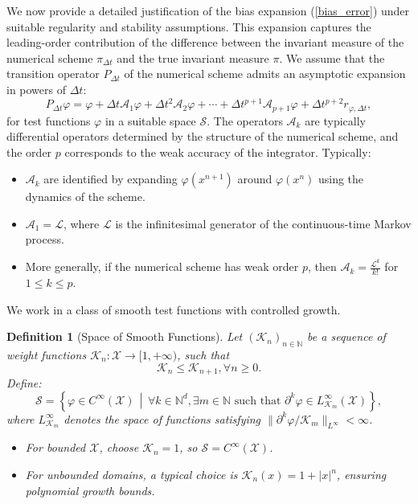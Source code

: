 \documentclass{article}
\newtheorem{definition}[theorem]{Definition}
\begin{document}
We now provide a detailed justification of the bias expansion (\ref{bias_error}) under suitable regularity and stability assumptions. This expansion captures the leading-order contribution of the difference between the invariant measure of the numerical scheme $\pi_{\Delta t}$ and the true invariant measure $\pi$. We assume that the transition operator $P_{\Delta t}$ of the numerical scheme admits an asymptotic expansion in powers of $\Delta t$:
\[
P_{\Delta t} \varphi = \varphi + \Delta t \mathcal{A}_1 \varphi + \Delta t^2 \mathcal{A}_2 \varphi + \cdots + \Delta t^{p+1} \mathcal{A}_{p+1} \varphi + \Delta t^{p+2} r_{\varphi, \Delta t},
\]
for test functions $\varphi$ in a suitable space $\mathcal{S}$. The operators $\mathcal{A}_k$ are typically differential operators determined by the structure of the numerical scheme, and the order $p$ corresponds to the weak accuracy of the integrator. Typically:
\begin{itemize}
    \item $\mathcal{A}_k$ are identified by expanding $\varphi(x^{n+1})$ around $\varphi(x^n)$ using the dynamics of the scheme.
    \item $\mathcal{A}_1 = \mathcal{L}$, where $\mathcal{L}$ is the infinitesimal generator of the continuous-time Markov process.
    \item More generally, if the numerical scheme has weak order $p$, then $\mathcal{A}_k = \frac{\mathcal{L}^k}{k!}$ for $1 \leq k \leq p$.
\end{itemize}  
We work in a class of smooth test functions with controlled growth.
\begin{definition}[Space of Smooth Functions]
Let $(\mathcal{K}_n)_{n \in \mathbb{N}}$ be a sequence of weight functions $\mathcal{K}_n : \mathcal{X} \to [1, +\infty)$, such that
\[\mathcal{K}_n \leq \mathcal{K}_{n+1}, \forall n \geq 0.\]
Define:
\[
\mathcal{S} = \left\{ \varphi \in C^\infty(\mathcal{X}) \,\middle|\, \forall k \in \mathbb{N}^d, \exists m \in \mathbb{N} \text{ such that } \partial^k \varphi \in L^\infty_{\mathcal{K}_m}(\mathcal{X}) \right\},
\]
where $L^\infty_{\mathcal{K}_m}$ denotes the space of functions satisfying $\|\partial^k \varphi / \mathcal{K}_m\|_{L^\infty} < \infty$.

\begin{itemize}
    \item For bounded $\mathcal{X}$, choose $\mathcal{K}_n = 1$, so $\mathcal{S} = C^\infty(\mathcal{X})$.
    \item For unbounded domains, a typical choice is $\mathcal{K}_n(x) = 1 + |x|^n$, ensuring polynomial growth bounds.
\end{itemize}
\end{definition}
\end{document}
